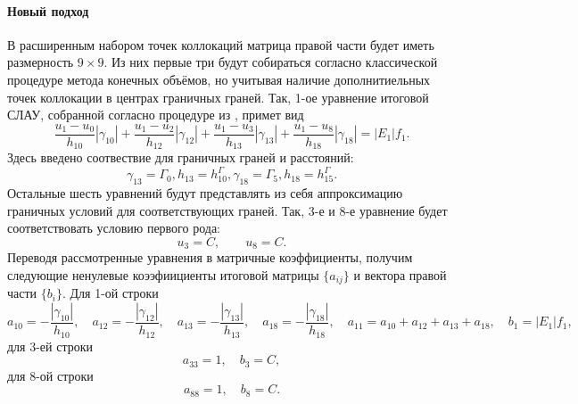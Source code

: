 \paragraph{Новый подход}
В расширенным набором точек коллокаций
матрица правой части будет иметь размерность $9\times9$.
Из них первые три будут собираться согласно классической процедуре
метода конечных объёмов, но учитывая наличие дополнитиельных точек коллокации в центрах
граничных граней. Так, 1-ое уравнение итоговой СЛАУ, собранной согласно процедуре из
,
примет вид
$$
\frac{u_1 - u_0}{h_{10}}|\gamma_{10}|
+\frac{u_1 - u_2}{h_{12}}|\gamma_{12}|
+\frac{u_1 - u_3}{h_{13}}|\gamma_{13}|
+\frac{u_1 - u_8}{h_{18}}|\gamma_{18}|
= |E_1| f_1.
$$
Здесь введено соотвествие для граничных граней и расстояний:
$$
\gamma_{13} = \Gamma_0, h_{13} = h^\Gamma_{10}, \gamma_{18} = \Gamma_5, h_{18} = h^\Gamma_{15}.
$$
Остальные шесть уравнений будут представлять из себя
аппроксимацию граничных условий для соответствующих граней.
Так, 3-е и 8-е уравнение будет соответствовать условию первого рода:
$$
u_3 = C, \qquad u_8 = C.
$$
Переводя рассмотренные уравнения в матричные коэффициенты, получим
следующие ненулевые коээфиициенты итоговой матрицы $\{a_{ij}\}$ и вектора правой части $\{b_i\}$. Для 1-ой строки
$$
a_{10} = -\frac{|\gamma_{10}|}{h_{10}},  \quad
a_{12} = -\frac{|\gamma_{12}|}{h_{12}},  \quad
a_{13} = -\frac{|\gamma_{13}|}{h_{13}},  \quad
a_{18} = -\frac{|\gamma_{18}|}{h_{18}},  \quad
a_{11} = a_{10} + a_{12} + a_{13} + a_{18}, \quad
b_1 = |E_1| f_1,
$$
для 3-ей строки
$$
a_{33} = 1, \quad b_3 = C,
$$
для 8-ой строки
$$
a_{88} = 1, \quad b_8 = C.
$$

